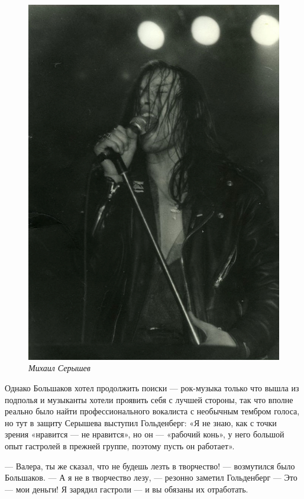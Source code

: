 \documentclass[16pt,a5paper,oneside]{book}
\begin{document}
\begin{figure}
    \centering
    \includegraphics[scale=0.9]{Image20}
    \caption{\textit{Михаил Серышев}}
\end{figure}

Однако Большаков хотел продолжить поиски — рок-музыка только что вышла из подполья и музыканты хотели проявить себя с
лучшей стороны, так что вполне реально было найти профессионального вокалиста с необычным тембром голоса, но тут в
защиту Серышева выступил Гольденберг: «Я не знаю, как с точки зрения «нравится — не нравится», но он — «рабочий конь», у
него большой опыт гастролей в прежней группе, поэтому пусть он работает».

— Валера, ты же сказал, что не будешь лезть в творчество! — возмутился было Большаков.
— А я не в творчество лезу, — резонно заметил Гольденберг — Это — мои деньги! Я зарядил гастроли — и вы обязаны их
отработать.
\end{document}
